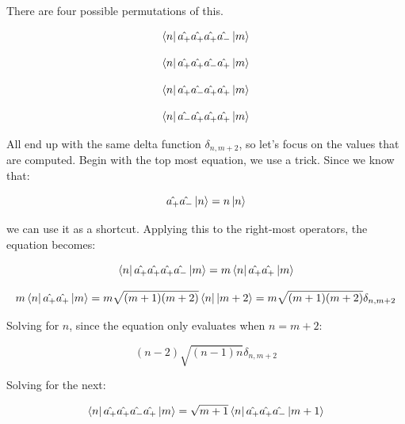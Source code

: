 \documentclass[12pt]{article}
\begin{document}
There are four possible permutations of this.

\begin{equation}
\bra{n} \hat{a_+}\hat{a_+}\hat{a_+}\hat{a_-} \ket{m} 
\end{equation}

\begin{equation}
\bra{n} \hat{a_+}\hat{a_+}\hat{a_-}\hat{a_+} \ket{m} 
\end{equation}

\begin{equation}
\bra{n} \hat{a_+}\hat{a_-}\hat{a_+}\hat{a_+} \ket{m} 
\end{equation}

\begin{equation}
\bra{n} \hat{a_-}\hat{a_+}\hat{a_+}\hat{a_+} \ket{m} 
\end{equation}

All end up with the same delta function $\delta_{n, m+2}$, so let's focus on the values that are computed. Begin with the top most equation, we use a trick. Since we know that:

\begin{equation}
\hat{a_+} \hat{a_-} \ket{n} = n \ket{n}
\end{equation}

we can use it as a shortcut. Applying this to the right-most operators, the equation becomes:

\begin{equation}
\bra{n} \hat{a_+}\hat{a_+}\hat{a_+}\hat{a_-} \ket{m}  = 
m \bra{n} \hat{a_+}\hat{a_+} \ket{m}
\end{equation}

\begin{equation}
m \bra{n} \hat{a_+}\hat{a_+} \ket{m} = m \sqrt{ (m+1) (m+2) } \bra{n}\ket{m+2} = 
m \sqrt{ (m+1) (m+2) } \delta_{n, m+2}
\end{equation}

Solving for $n$, since the equation only evaluates when $n = m+2$:

\begin{equation}
(n-2) \sqrt{ (n-1) n} \delta_{n, m+2}
\end{equation}

Solving for the next:

\begin{equation}
\bra{n} \hat{a_+}\hat{a_+}\hat{a_-}\hat{a_+} \ket{m} = \sqrt{m+1} \bra{n} \hat{a_+}\hat{a_+}\hat{a_-} \ket{m + 1}
\end{equation}
\end{document}
